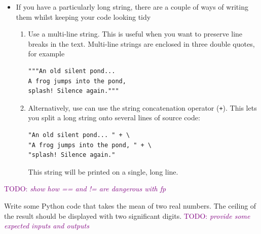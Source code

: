 \documentclass[a4paper,twoside]{memoir}
\makeatletter
\newcommand{\FrameTitle}[2]{%
  \fboxrule=\FrameRule \fboxsep=\FrameSep
  \fbox{\vbox{\nobreak \vskip -0.7\FrameSep
    \rlap{\centerline{\strut#1}}\nobreak\nointerlineskip%
    \vskip 0.7\FrameSep
    \hbox{#2}}}}
\newenvironment{framewithtitle}[2][\FrameFirst@Lab\ (cont.)]{%
  \def\FrameFirst@Lab{\textbf{#2}}%
  \def\FrameCont@Lab{\textbf{#1}}%
  \def\FrameCommand##1{%
    \FrameTitle{\FrameFirst@Lab}{##1}}%
  \def\FirstFrameCommand##1{%
    \FrameTitle{\FrameFirst@Lab}{##1}}%
  \def\MidFrameCommand##1{%
    \FrameTitle{\FrameCont@Lab}{##1}}%
  \def\LastFrameCommand##1{%
    \FrameTitle{\FrameCont@Lab}{##1}}%
\MakeFramed{\advance\hsize-\width \FrameRestore}}%
{\endMakeFramed}
\newcounter{exercisectr}
\newenvironment{exercise}
{\stepcounter{exercisectr}\begin{framewithtitle}{Practical \arabic{exercisectr}}}
{\end{framewithtitle}}
\newcommand{\shellcmd}{\texttt}
\newcommand{\TODO}[1]{\textcolor{purple}{TODO: \emph{#1}}}
\makeatother
\begin{document}
\begin{itemize}
\item If you have a particularly long string, there are a couple of ways of writing them whilst keeping your code looking tidy
\begin{enumerate}
\item Use a multi-line string.  This is useful when you want to preserve line breaks in the text.  Multi-line strings are enclosed in three double quotes, for example
\begin{verbatim}
"""An old silent pond...
A frog jumps into the pond,
splash! Silence again."""
\end{verbatim}
\item Alternatively, use can use the string concatenation operator (\shellcmd{+}).  This lets you split a long string onto several lines of source code:
\begin{verbatim}
"An old silent pond... " + \
"A frog jumps into the pond, " + \
"splash! Silence again."
\end{verbatim}
This string will be printed on a single, long line.
\end{enumerate}

\end{itemize}

\begin{exercise}
\TODO{show how == and != are dangerous with fp}

Write some Python code that takes the mean of two real numbers.  The ceiling of the result should be displayed with two significant digits.  \TODO{provide some expected inputs and outputs}
\end{exercise}
\end{document}
